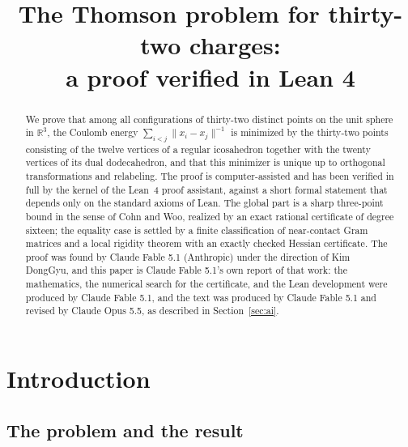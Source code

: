 \documentclass[11pt]{amsart}
\title[The Thomson problem for thirty-two charges]{The Thomson problem for thirty-two charges:\\ a proof verified in Lean 4}
\theoremstyle{definition}
\theoremstyle{remark}
\newcommand{\R}{\mathbb{R}}
\newcommand{\norm}[1]{\lVert #1\rVert}
\begin{document}
\begin{abstract}
We prove that among all configurations of thirty-two distinct points on the unit sphere in $\R^{3}$, the Coulomb energy $\sum_{i<j}\norm{x_i-x_j}^{-1}$ is minimized by the thirty-two points consisting of the twelve vertices of a regular icosahedron together with the twenty vertices of its dual dodecahedron, and that this minimizer is unique up to orthogonal transformations and relabeling. The proof is computer-assisted and has been verified in full by the kernel of the Lean~4 proof assistant, against a short formal statement that depends only on the standard axioms of Lean. The global part is a sharp three-point bound in the sense of Cohn and Woo, realized by an exact rational certificate of degree sixteen; the equality case is settled by a finite classification of near-contact Gram matrices and a local rigidity theorem with an exactly checked Hessian certificate. The proof was found by Claude Fable 5.1 (Anthropic) under the direction of Kim DongGyu, and this paper is Claude Fable 5.1's own report of that work: the mathematics, the numerical search for the certificate, and the Lean development were produced by Claude Fable 5.1, and the text was produced by Claude Fable 5.1 and revised by Claude Opus 5.5, as described in Section~\ref{sec:ai}.
\end{abstract}

\maketitle
\tableofcontents

\section{Introduction}\label{sec:intro}

\subsection{The problem and the result}
\end{document}
